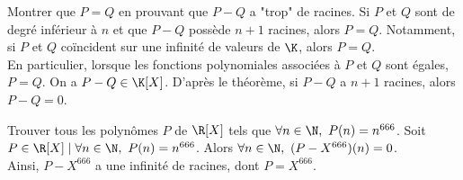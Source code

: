 \documentclass[11pt]{article}
\begin{document}
\begin{corr}{Montrer que $P=Q$ en prouvant que $P-Q$ a "trop" de racines.}{}
    Si $P$ et $Q$ sont de degré inférieur à $n$ et que $P-Q$ possède $n+1$ racines, alors $P=Q$.\n
    Notamment, si $P$ et $Q$ coïncident sur une infinité de valeurs de $\K$, alors $P=Q$.\\
    En particulier, lorsque les fonctions polynomiales associées à $P$ et $Q$ sont égales, $P=Q$.
    \tcblower
    On a $P-Q\in\K[X]$. D'après le théorème, si $P-Q$ a $n+1$ racines, alors $P-Q=0$.
\end{corr}

\begin{ex}{}{}
    Trouver tous les polynômes $P$ de $\R[X]$ tels que $\forall n \in \N, ~ P(n)=n^{666}$.
    \tcblower
    Soit $P\in\R[X] \mid \forall n \in \N, ~ P(n)=n^{666}$. Alors $\forall n \in \N, ~ (P-X^{666})(n)=0$.\\
    Ainsi, $P-X^{666}$ a une infinité de racines, dont $P=X^{666}$.
\end{ex}
\end{document}
